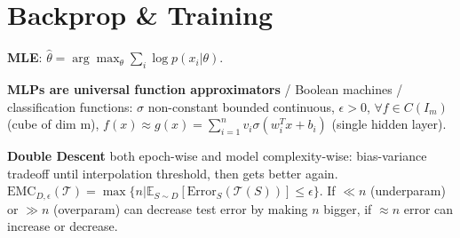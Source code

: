 \section{Backprop \& Training}
\textbf{MLE}: \(\hat{\theta} = \arg\max_\theta \sum_{i}\log p(x_i|\theta)\).

\textbf{MLPs are universal function approximators} / Boolean machines / classification functions: $\sigma$ non-constant bounded continuous, $\epsilon > 0$, $\forall f \in C(I_m)$ (cube of dim m), $f(x) \approx g(x) = \sum_{i=1}^{n} v_i \sigma(w_i^T x + b_i)$ (single hidden layer).

\textbf{Double Descent} both epoch-wise and model complexity-wise: bias-variance tradeoff until interpolation threshold, then gets better again. $\text{EMC}_{D,\epsilon}(\mathcal{T}) = \max\{n | \mathbb{E}_{S\sim D}\left[\text{Error}_S(\mathcal{T}(S))\right] \leq \epsilon\}$. If $\ll n$ (underparam) or $\gg n$ (overparam) can decrease test error by making $n$ bigger, if $\approx n$ error can increase or decrease.